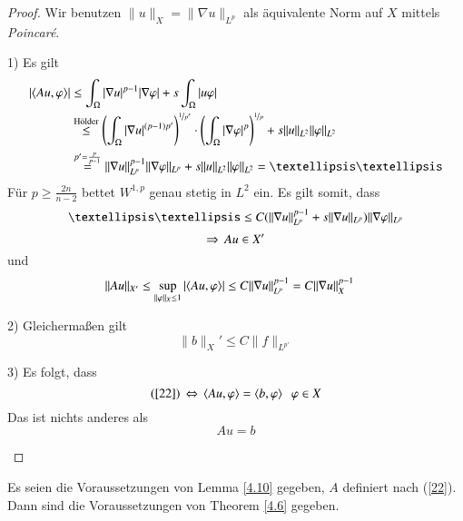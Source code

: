 \begin{proof}
    Wir benutzen $\|u\|_X=\|\nabla u \|_{L^p}$ als äquivalente Norm auf $X$ mittels \textit{Poincaré}.
    \begin{description}
        \item{1)}
        Es gilt
        \begin{align*}
            |\lal Au,\vp \ral| &\leq \int_\Omega |\nabla u |^{p-1}|\nabla \vp| + s\int_\Omega |u\vp|\\
            &\overset{\text{Hölder}}{\leq} \left( \int_\Omega |\nabla u|^{(p-1)p'} \right)
            ^{\nicefrac1{p'}}\cdot \left( \int_\Omega |\nabla \vp|^p \right)^{\nicefrac 1p}
            +s \|u\|_{L^2}\|\vp\|_{L^2}\\
            &\overset{p'=\frac{p}{p-1}}{=} \|\nabla u\|_{L^p}^{p-1} \|\nabla \vp\|_{L^p} +
            s \|u\|_{L^2}\|\vp\|_{L^2}= ……
        \end{align*}
        Für $p\geq \frac{2n}{n-2}$ bettet $W^{1,p}$ genau stetig in $L^2$ ein. Es gilt somit, dass
        \[
            ……\leq C (\|\nabla u \|_{L^p}^{p-1}+s\|\nabla u\|_{L^p})\|\nabla\vp\|_{L^p}
        \]
        \[
            \Rightarrow \, Au\in X'
        \]
        und
        \begin{align*}
            \|Au\|_{X'}&\leq \sup_{\|\varphi\|_X\leq1} |\langle Au,\varphi \rangle| \leq C \|\nabla u\|_{L^p}^{p-1}
            =C\|\nabla u\|_X^{p-1}
        \end{align*}
        \item{2)}
        Gleichermaßen gilt
        \[
            \|b\|_X' \leq C\|f\|_{L^{p'}}
        \]
        \item{3)}
        Es folgt, dass
        \[
            (\ref{22}) \, \Leftrightarrow \, \langle Au,\varphi\rangle= \langle b,\varphi\rangle \hspace{.25cm} \varphi \in X
        \]
        Das ist nichts anderes als
        \[
            Au=b
        \]
    \end{description}\[ \]
\end{proof}

\begin{lem}\label{4.11}
    Es seien die Voraussetzungen von Lemma \ref{4.10} gegeben, $A$ definiert nach (\ref{22}). Dann sind
    die Voraussetzungen von Theorem \ref{4.6} gegeben.
\end{lem}

